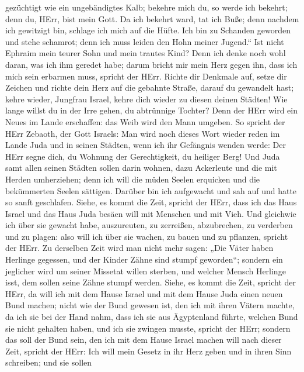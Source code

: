 gezüchtigt wie ein ungebändigtes Kalb; bekehre mich du, so werde ich
bekehrt; denn du, HErr, bist mein Gott.  Da ich bekehrt
ward, tat ich Buße; denn nachdem ich gewitzigt bin, schlage ich mich auf
die Hüfte. Ich bin zu Schanden geworden und stehe schamrot; denn ich
muss leiden den Hohn meiner Jugend.``  Ist nicht Ephraim
mein teurer Sohn und mein trautes Kind? Denn ich denke noch wohl daran,
was ich ihm geredet habe; darum bricht mir mein Herz gegen ihn, dass ich
mich sein erbarmen muss, spricht der HErr.  Richte dir
Denkmale auf, setze dir Zeichen und richte dein Herz auf die gebahnte
Straße, darauf du gewandelt hast; kehre wieder, Jungfrau Israel, kehre
dich wieder zu diesen deinen Städten!  Wie lange willst du
in der Irre gehen, du abtrünnige Tochter? Denn der HErr wird ein Neues
im Lande erschaffen: das Weib wird den Mann umgeben.  So
spricht der HErr Zebaoth, der Gott Israels: Man wird noch dieses Wort
wieder reden im Lande Juda und in seinen Städten, wenn ich ihr Gefängnis
wenden werde: Der HErr segne dich, du Wohnung der Gerechtigkeit, du
heiliger Berg!  Und Juda samt allen seinen Städten sollen
darin wohnen, dazu Ackerleute und die mit Herden umherziehen;
 denn ich will die müden Seelen erquicken und die
bekümmerten Seelen sättigen.  Darüber bin ich aufgewacht
und sah auf und hatte so sanft geschlafen.  Siehe, es kommt
die Zeit, spricht der HErr, dass ich das Haus Israel und das Haus Juda
besäen will mit Menschen und mit Vieh.  Und gleichwie ich
über sie gewacht habe, auszureuten, zu zerreißen, abzubrechen, zu
verderben und zu plagen: also will ich über sie wachen, zu bauen und zu
pflanzen, spricht der HErr.  Zu derselben Zeit wird man
nicht mehr sagen: „Die Väter haben Herlinge gegessen, und der Kinder
Zähne sind stumpf geworden``;  sondern ein jeglicher wird
um seiner Missetat willen sterben, und welcher Mensch Herlinge isst, dem
sollen seine Zähne stumpf werden.  Siehe, es kommt die
Zeit, spricht der HErr, da will ich mit dem Hause Israel und mit dem
Hause Juda einen neuen Bund machen;  nicht wie der Bund
gewesen ist, den ich mit ihren Vätern machte, da ich sie bei der Hand
nahm, dass ich sie aus Ägyptenland führte, welchen Bund sie nicht
gehalten haben, und ich sie zwingen musste, spricht der HErr;
 sondern das soll der Bund sein, den ich mit dem Hause
Israel machen will nach dieser Zeit, spricht der HErr: Ich will mein
Gesetz in ihr Herz geben und in ihren Sinn schreiben; und sie sollen
